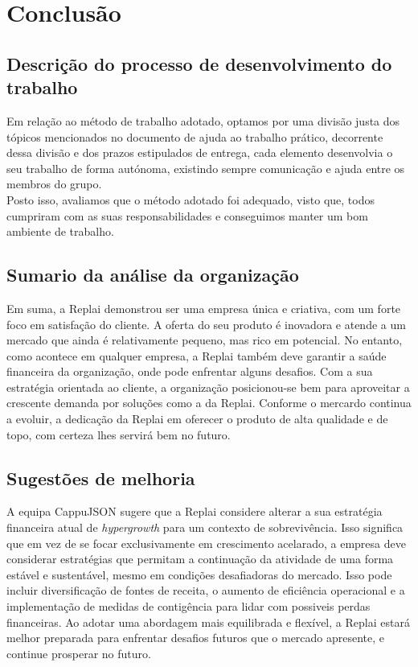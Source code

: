 \chapter{Conclusão}


\section{Descrição do processo de desenvolvimento do trabalho}
Em relação ao método de trabalho adotado, optamos por uma divisão justa dos tópicos mencionados no documento de ajuda ao trabalho prático, decorrente dessa divisão e dos prazos estipulados de entrega, cada elemento desenvolvia o seu trabalho de forma autónoma, existindo sempre comunicação e ajuda entre os membros do grupo.\\

Posto isso, avaliamos que o método adotado foi adequado, visto que, todos cumpriram com as suas responsabilidades e conseguimos manter um bom ambiente de trabalho.\\     

\section{Sumario da análise da organização}
Em suma, a Replai demonstrou ser uma empresa única e criativa, com um forte foco em satisfação do cliente. A oferta do seu produto é inovadora e atende a um mercado que ainda é relativamente pequeno, mas rico em potencial. No entanto, como acontece em qualquer empresa, a Replai também deve garantir a saúde financeira da organização, onde pode enfrentar alguns desafios. Com a sua estratégia orientada ao cliente, a organização posicionou-se bem para aproveitar a crescente demanda por soluções como a da Replai. Conforme o mercardo continua a evoluir, a dedicação da Replai em oferecer o produto de alta qualidade e de topo, com certeza lhes servirá bem no futuro. 


\section{Sugestões de melhoria}
A equipa CappuJSON sugere que a Replai considere alterar a sua estratégia financeira atual de \emph{hypergrowth} para um contexto de sobrevivência. Isso significa que em vez de se focar exclusivamente em crescimento acelarado, a empresa deve considerar estratégias que permitam a continuação da atividade de uma forma estável e sustentável, mesmo em condições desafiadoras do mercado. Isso pode incluir diversificação de fontes de receita, o aumento de eficiência operacional e a implementação de medidas de contigência para lidar com possiveis perdas financeiras. Ao adotar uma abordagem mais equilibrada e flexível, a Replai estará melhor preparada para enfrentar desafios futuros que o mercado apresente, e continue prosperar no futuro. 